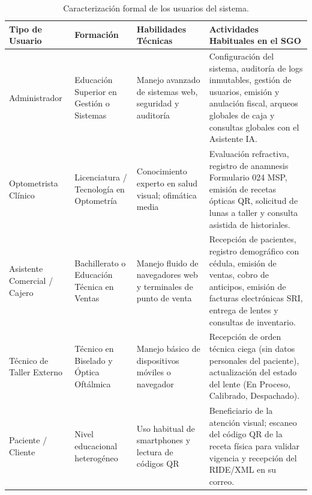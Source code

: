\documentclass[12pt,a4paper]{report}
\begin{document}
\begin{table}[H]
\centering
\small
\begin{tabularx}{\textwidth}{|L{2.8cm}|L{3.0cm}|L{3.5cm}|X|}
\hline
{}\color{white}\textbf{Tipo de Usuario} & \color{white}\textbf{Formación} & \color{white}\textbf{Habilidades Técnicas} & \color{white}\textbf{Actividades Habituales en el SGO} \\
\hline
Administrador & Educación Superior en Gestión o Sistemas & Manejo avanzado de sistemas web, seguridad y auditoría & Configuración del sistema, auditoría de logs inmutables, gestión de usuarios, emisión y anulación fiscal, arqueos globales de caja y consultas globales con el Asistente IA. \\
\hline
Optometrista Clínico & Licenciatura / Tecnología en Optometría & Conocimiento experto en salud visual; ofimática media & Evaluación refractiva, registro de anamnesis Formulario 024 MSP, emisión de recetas ópticas QR, solicitud de lunas a taller y consulta asistida de historiales. \\
\hline
Asistente Comercial / Cajero & Bachillerato o Educación Técnica en Ventas & Manejo fluido de navegadores web y terminales de punto de venta & Recepción de pacientes, registro demográfico con cédula, emisión de ventas, cobro de anticipos, emisión de facturas electrónicas SRI, entrega de lentes y consultas de inventario. \\
\hline
Técnico de Taller Externo & Técnico en Biselado y Óptica Oftálmica & Manejo básico de dispositivos móviles o navegador & Recepción de orden técnica ciega (sin datos personales del paciente), actualización del estado del lente (En Proceso, Calibrado, Despachado). \\
\hline
Paciente / Cliente & Nivel educacional heterogéneo & Uso habitual de smartphones y lectura de códigos QR & Beneficiario de la atención visual; escaneo del código QR de la receta física para validar vigencia y recepción del RIDE/XML en su correo. \\
\hline
\end{tabularx}
\caption{Caracterización formal de los usuarios del sistema.}
\label{tab:usuarios}
\end{table}
\end{document}
